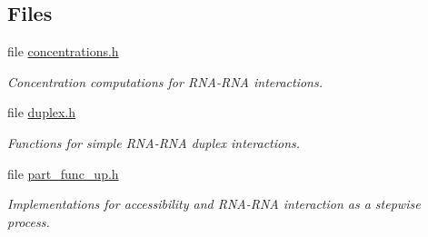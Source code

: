 \subsection*{Files}
\begin{DoxyCompactItemize}
\item 
file \hyperlink{concentrations_8h}{concentrations.\+h}
\begin{DoxyCompactList}\small\item\em Concentration computations for R\+N\+A-\/\+R\+NA interactions. \end{DoxyCompactList}\item 
file \hyperlink{duplex_8h}{duplex.\+h}
\begin{DoxyCompactList}\small\item\em Functions for simple R\+N\+A-\/\+R\+NA duplex interactions. \end{DoxyCompactList}\item 
file \hyperlink{part__func__up_8h}{part\+\_\+func\+\_\+up.\+h}
\begin{DoxyCompactList}\small\item\em Implementations for accessibility and R\+N\+A-\/\+R\+NA interaction as a stepwise process. \end{DoxyCompactList}\end{DoxyCompactItemize}
